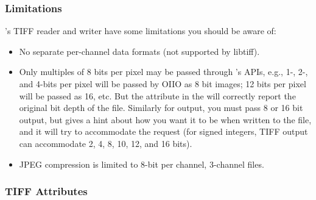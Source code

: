 \subsubsection*{Limitations}

\product's TIFF reader and writer have some limitations you should be
aware of:
\begin{itemize}
\item No separate per-channel data formats (not supported by {\cf
  libtiff}).
\item Only multiples of 8 bits per pixel may be passed through
  \product's APIs, e.g., 1-, 2-, and 4-bits per pixel will be passed
  by OIIO as 8 bit images; 12 bits per pixel will be passed as 16,
  etc.  But the  attribute in the \ImageSpec
  will correctly report the original bit depth of the file. Similarly
  for output, you must pass 8 or 16 bit output, but 
  gives a hint about how you want it to be when written to the file, and
  it will try to accommodate the request (for signed integers,
  TIFF output can accommodate 2, 4, 8, 10, 12, and 16 bits).
\item JPEG compression is limited to 8-bit per channel, 3-channel files.
\end{itemize}


\newpage
\subsubsection*{TIFF Attributes}

